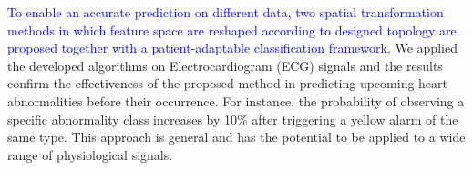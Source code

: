 \textcolor{blue}{To enable an accurate prediction on different data, two spatial transformation methods in which feature space are reshaped according to designed topology are proposed together with a patient-adaptable classification framework.} %
We applied the developed algorithms on Electrocardiogram (ECG) signals and the results confirm the \textcolor{black}{effectiveness} of the proposed method in predicting upcoming heart abnormalities before their occurrence. For instance, the probability of observing a specific abnormality class increases by 10\% after triggering a yellow alarm of the same type. This approach is general and has the potential to be applied to a wide range of physiological signals.


